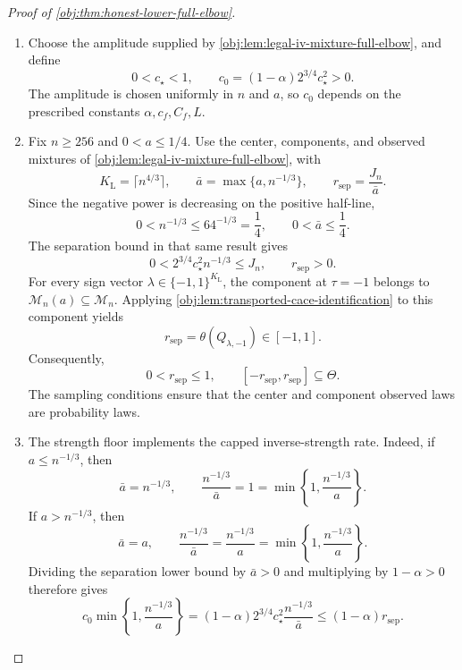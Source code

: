 \begin{proof}[Proof of \cref{obj:thm:honest-lower-full-elbow}]
\begin{enumerate}
\item Choose the amplitude supplied by \cref{obj:lem:legal-iv-mixture-full-elbow}, and define
\[
0<c_{\star}<1,
\qquad
c_0=(1-\alpha)2^{3/4}c_{\star}^2>0.
\]
The amplitude is chosen uniformly in \(n\) and \(a\), so \(c_0\) depends on the prescribed constants \(\alpha,c_f,C_f,L\).

\item Fix \(n\ge256\) and \(0<a\le1/4\). Use the center, components, and observed mixtures of \cref{obj:lem:legal-iv-mixture-full-elbow}, with
\[
K_{\mathrm L}=\lceil n^{4/3}\rceil,
\qquad
\bar a=\max\{a,n^{-1/3}\},
\qquad
r_{\mathrm{sep}}=\frac{J_n}{\bar a}.
\]
Since the negative power is decreasing on the positive half-line,
\[
0<n^{-1/3}\le64^{-1/3}=\frac14,
\qquad
0<\bar a\le\frac14.
\]
The separation bound in that same result gives
\[
0<2^{3/4}c_{\star}^2n^{-1/3}\le J_n,
\qquad
r_{\mathrm{sep}}>0.
\]
For every sign vector \(\lambda\in\{-1,1\}^{K_{\mathrm L}}\), the component at \(\tau=-1\) belongs to \(\mathcal M_n(a)\subseteq\mathcal M_n\). Applying \cref{obj:lem:transported-cace-identification} to this component yields
\[
r_{\mathrm{sep}}
=\theta(Q_{\lambda,-1})
\in[-1,1].
\]
Consequently,
\[
0<r_{\mathrm{sep}}\le1,
\qquad
[-r_{\mathrm{sep}},r_{\mathrm{sep}}]\subseteq\Theta.
\]
The sampling conditions ensure that the center and component observed laws are probability laws.

\item The strength floor implements the capped inverse-strength rate. Indeed, if \(a\le n^{-1/3}\), then
\[
\bar a=n^{-1/3},
\qquad
\frac{n^{-1/3}}{\bar a}=1
=\min\left\{1,\frac{n^{-1/3}}a\right\}.
\]
If \(a>n^{-1/3}\), then
\[
\bar a=a,
\qquad
\frac{n^{-1/3}}{\bar a}
=\frac{n^{-1/3}}a
=\min\left\{1,\frac{n^{-1/3}}a\right\}.
\]
Dividing the separation lower bound by \(\bar a>0\) and multiplying by \(1-\alpha>0\) therefore gives
\[
c_0\min\left\{1,\frac{n^{-1/3}}a\right\}
=(1-\alpha)2^{3/4}c_{\star}^2
  \frac{n^{-1/3}}{\bar a}
\le(1-\alpha)r_{\mathrm{sep}}.
\]


\end{enumerate}
\end{proof}
